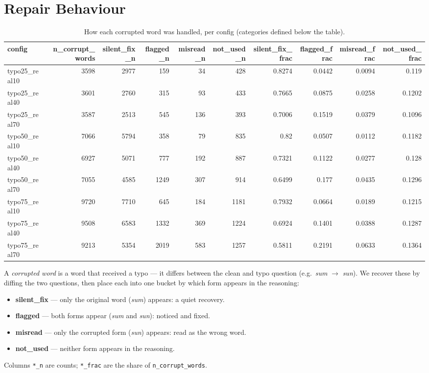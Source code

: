 \documentclass[11pt]{article}
\begin{document}
\section*{Repair Behaviour}
\begin{table}[H]
\centering
\caption{How each corrupted word was handled, per config (categories defined below the table).}
\small
\begin{adjustbox}{max width=\textwidth}
\begin{tabular}{lrrrrrrrrr}
\toprule
\textbf{config} & \textbf{n\_corrupt\_words} & \textbf{silent\_fix\_n} & \textbf{flagged\_n} & \textbf{misread\_n} & \textbf{not\_used\_n} & \textbf{silent\_fix\_frac} & \textbf{flagged\_frac} & \textbf{misread\_frac} & \textbf{not\_used\_frac} \\
\midrule
typo25\_real10 & 3598 & 2977 & 159 & 34 & 428 & 0.8274 & 0.0442 & 0.0094 & 0.119 \\
typo25\_real40 & 3601 & 2760 & 315 & 93 & 433 & 0.7665 & 0.0875 & 0.0258 & 0.1202 \\
typo25\_real70 & 3587 & 2513 & 545 & 136 & 393 & 0.7006 & 0.1519 & 0.0379 & 0.1096 \\
typo50\_real10 & 7066 & 5794 & 358 & 79 & 835 & 0.82 & 0.0507 & 0.0112 & 0.1182 \\
typo50\_real40 & 6927 & 5071 & 777 & 192 & 887 & 0.7321 & 0.1122 & 0.0277 & 0.128 \\
typo50\_real70 & 7055 & 4585 & 1249 & 307 & 914 & 0.6499 & 0.177 & 0.0435 & 0.1296 \\
typo75\_real10 & 9720 & 7710 & 645 & 184 & 1181 & 0.7932 & 0.0664 & 0.0189 & 0.1215 \\
typo75\_real40 & 9508 & 6583 & 1332 & 369 & 1224 & 0.6924 & 0.1401 & 0.0388 & 0.1287 \\
typo75\_real70 & 9213 & 5354 & 2019 & 583 & 1257 & 0.5811 & 0.2191 & 0.0633 & 0.1364 \\
\bottomrule
\end{tabular}
\end{adjustbox}
\end{table}

\noindent A \emph{corrupted word} is a word that received a
typo --- it differs between the clean and typo question (e.g.\ \emph{sum} $\to$
\emph{sun}). We recover these by diffing the two questions, then place each into one
bucket by which form appears in the reasoning:
\begin{itemize}\setlength{\itemsep}{1pt}
  \item \textbf{silent\_fix} --- only the original word (\emph{sum}) appears: a quiet recovery.
  \item \textbf{flagged} --- both forms appear (\emph{sum} and \emph{sun}): noticed and fixed.
  \item \textbf{misread} --- only the corrupted form (\emph{sun}) appears: read as the wrong word.
  \item \textbf{not\_used} --- neither form appears in the reasoning.
\end{itemize}
\noindent Columns \texttt{*\_n} are counts; \texttt{*\_frac} are the share of
\texttt{n\_corrupt\_words}.
\medskip
\end{document}
